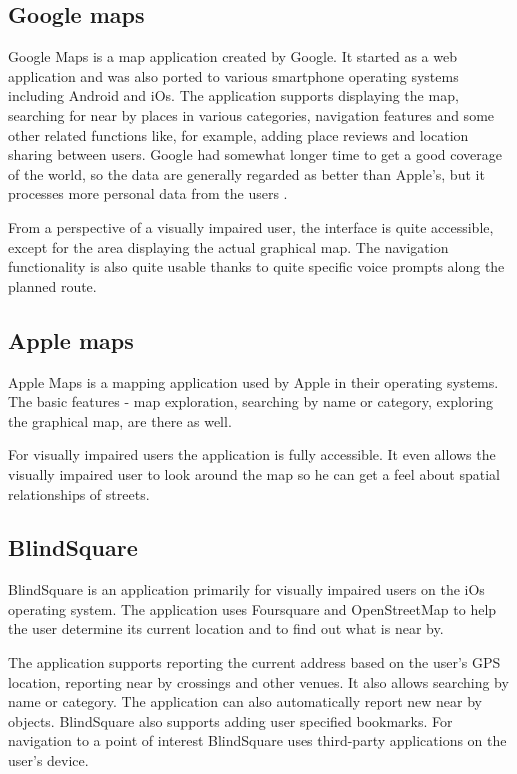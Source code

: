 \documentclass[nolof,digital]{fithesis3}
\begin{document}
\subsection{Google maps}
Google Maps \parencite{googlemaps} is a map application created by Google. It started as a web application and was also ported to various smartphone operating systems including Android and iOs. The application supports displaying the map, searching for near by places in various categories, navigation features and some other related functions like, for example, adding place reviews and location sharing between users. Google had somewhat longer time to get a good coverage of the world, so the data are generally regarded as better than Apple's, but it processes more personal data from the users \parencite{mapcomp}.

From a perspective of a visually impaired user, the interface is quite accessible, except for the area displaying the actual graphical map. The navigation functionality is also quite usable thanks to quite specific voice prompts along the planned route.
\subsection{Apple maps}
Apple Maps \parencite{applemaps} is a mapping application used by Apple in their operating systems. The basic features - map exploration, searching by name or category, exploring the graphical map, are there as well.

For visually impaired users the application is fully accessible. It even allows the visually impaired user to look around the map so he can get a feel about spatial relationships of streets.
\subsection{BlindSquare}
BlindSquare \parencite{blindsquare} is an application primarily for visually impaired users on the iOs operating system. The application uses Foursquare and OpenStreetMap to help the user determine its current location and to find out what is near by.

The application supports reporting the current address based on the user's GPS location, reporting near by crossings and other venues. It also allows searching by name or category. The application can also automatically report new near by objects. BlindSquare also supports adding user specified bookmarks. For navigation to a point of interest BlindSquare uses third-party applications on the user's device.
\end{document}
